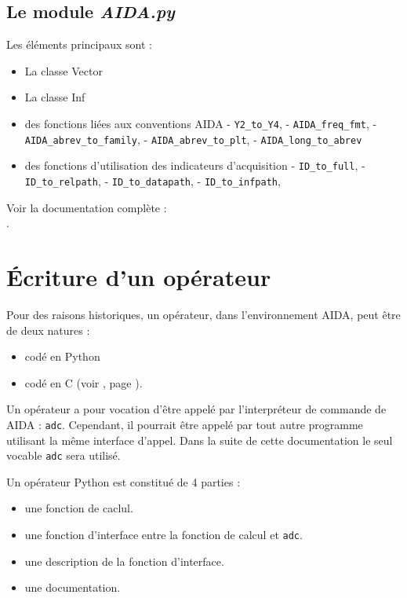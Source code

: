 \subsection{Le module \emph{AIDA.py}}
  Les éléments principaux sont :
  \begin{itemize}
    \item[•] La classe Vector
    \item[•] La classe Inf
    \item[•] des fonctions liées aux conventions AIDA
      \subitem - \texttt{Y2\_to\_Y4},
      \subitem - \texttt{AIDA\_freq\_fmt},
      \subitem - \texttt{AIDA\_abrev\_to\_family},
      \subitem - \texttt{AIDA\_abrev\_to\_plt},
      \subitem - \texttt{AIDA\_long\_to\_abrev}
    \item[•] des fonctions d'utilisation des indicateurs d'acquisition
      \subitem - \texttt{ID\_to\_full},
      \subitem - \texttt{ID\_to\_relpath},
      \subitem - \texttt{ID\_to\_datapath},
      \subitem - \texttt{ID\_to\_infpath},
  \end{itemize}

  Voir la documentation complète :  \\
\-\hspace{1cm} .


\section{Écriture d’un opérateur}
\label{sec:adc_oper}

  Pour des raisons historiques, un opérateur, dans l'environnement AIDA, peut
être de deux natures :
  \begin{itemize}
    \item[•] codé en Python
    \item[•] codé en C
             (voir , page \pageref{sec:ecr_oper}).
  \end{itemize}

\medbreak
  Un opérateur a pour vocation d'être appelé par l'interpréteur de commande de
AIDA : \texttt{adc}. Cependant, il pourrait être appelé par tout autre
programme utilisant la même interface d'appel. Dans la suite de cette
documentation le seul vocable \texttt{adc} sera utilisé.

\medbreak
  Un opérateur Python est constitué de 4 parties :
  \begin{itemize}
    \item[•] une fonction de caclul.
    \item[•] une fonction d'interface entre la fonction de calcul et
             \texttt{adc}.
    \item[•] une description de la fonction d'interface.
    \item[•] une documentation.
  \end{itemize}

